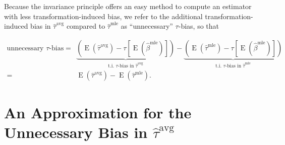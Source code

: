 \documentclass[11pt]{article}
\DeclareMathOperator*{\E}{\text{E}}
\begin{document}
Because the invariance principle offers an easy method to compute an estimator with less transformation-induced bias, we refer to the additional transformation-induced bias in $\hat{\tau}^\text{avg}$ compared to $\hat{\tau}^\text{mle}$ as ``unnecessary'' $\tau$-bias, so that 

\begin{align*}
\text{unnecessary } \tau\text{-bias} =& \underbrace{ \left( \E \left( \hat{\tau}^\text{avg}\right) - \tau \left[\E \left( \hat{\beta}^\text{mle} \right) \right] \right) }_{\text{t.i. } \tau\text{-bias in }\hat{\tau}^{\text{avg}}} - \underbrace{ \left( \E \left( \hat{\tau}^\text{mle}\right) -  \tau \left[\E \left( \hat{\beta}^\text{mle} \right) \right] \right) }_{\text{t.i. } \tau\text{-bias in }\hat{\tau}^{\text{mle}}} \\
 =& \E \left( \hat{\tau}^\text{avg}\right) - \E \left( \hat{\tau}^\text{mle}\right) .
\end{align*}

\section*{An Approximation for the Unnecessary Bias in $\hat{\tau}^\text{avg}$}
\end{document}
